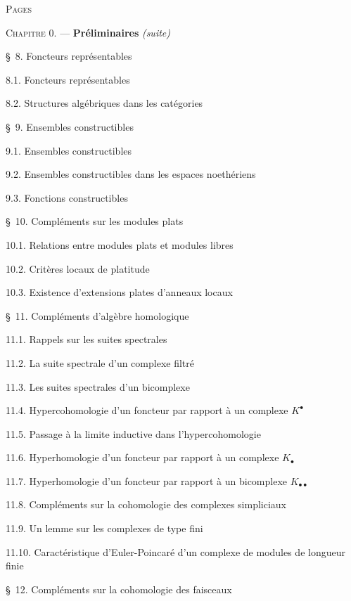 \begin{flushleft}
\hfill\textsc{Pages}

\textsc{Chapitre 0.} --- \textbf{Préliminaires} \textit{(suite)} 

\medskip
\S~8. Foncteurs représentables 

8.1. Foncteurs représentables 

8.2. Structures algébriques dans les catégories 

\medskip
\S~9. Ensembles constructibles 

9.1. Ensembles constructibles 

9.2. Ensembles constructibles dans les espaces noethériens 

9.3. Fonctions constructibles 

\medskip
\S~10. Compléments sur les modules plats 

10.1. Relations entre modules plats et modules libres 

10.2. Critères locaux de platitude 

10.3. Existence d'extensions plates d'anneaux locaux 

\medskip
\S~11. Compléments d'algèbre homologique 

11.1. Rappels sur les suites spectrales 

11.2. La suite spectrale d'un complexe filtré 

11.3. Les suites spectrales d'un bicomplexe 

11.4. Hypercohomologie d'un foncteur par rapport à un complexe $K^\bullet$

11.5. Passage à la limite inductive dans l'hypercohomologie 

11.6. Hyperhomologie d'un foncteur par rapport à un complexe $K_\bullet$

11.7. Hyperhomologie d'un foncteur par rapport à un bicomplexe
$K_{\bullet\bullet}$ 

11.8. Compléments sur la cohomologie des complexes simpliciaux 

11.9. Un lemme sur les complexes de type fini 

11.10. Caractéristique d'Euler-Poincaré d'un complexe de modules de longueur
finie 

\medskip
\S~12. Compléments sur la cohomologie des faisceaux 


\end{flushleft}
